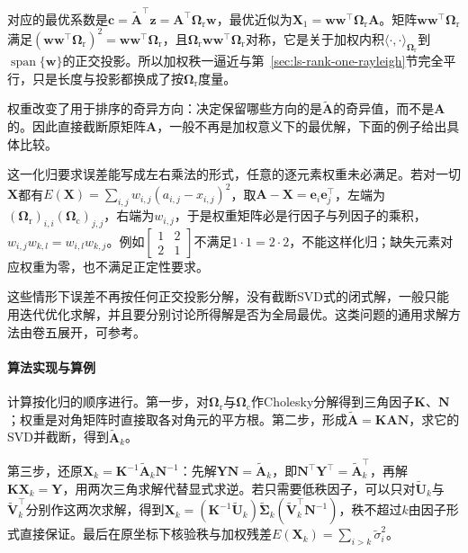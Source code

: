对应的最优系数是$\bm c=\widetilde{\bm A}^\top\bm z=\bm A^\top\bm\Omega_{\mathrm r}\bm w$，最优近似为$\bm X_1=\bm w\bm w^\top\bm\Omega_{\mathrm r}\bm A$。矩阵$\bm w\bm w^\top\bm\Omega_{\mathrm r}$满足$(\bm w\bm w^\top\bm\Omega_{\mathrm r})^2=\bm w\bm w^\top\bm\Omega_{\mathrm r}$，且$\bm\Omega_{\mathrm r}\bm w\bm w^\top\bm\Omega_{\mathrm r}$对称，它是关于加权内积$\langle\cdot,\cdot\rangle_{\bm\Omega_{\mathrm r}}$到$\operatorname{span}\{\bm w\}$的正交投影。所以加权秩一逼近与第~\ref{sec:ls-rank-one-rayleigh}节完全平行，只是长度与投影都换成了按$\bm\Omega_{\mathrm r}$度量。

权重改变了用于排序的奇异方向：决定保留哪些方向的是$\widetilde{\bm A}$的奇异值，而不是$\bm A$的。因此直接截断原矩阵$\bm A$，一般不再是加权意义下的最优解，下面的例子给出具体比较。

这一化归要求误差能写成左右乘法的形式，任意的逐元素权重未必满足。若对一切$\bm X$都有$E(\bm X)=\sum_{i,j}w_{i,j}(a_{i,j}-x_{i,j})^2$，取$\bm A-\bm X=\bm e_i\bm e_j^\top$，左端为$(\bm\Omega_{\mathrm r})_{i,i}(\bm\Omega_{\mathrm c})_{j,j}$，右端为$w_{i,j}$，于是权重矩阵必是行因子与列因子的乘积，$w_{i,j}w_{k,l}=w_{i,l}w_{k,j}$。例如$\left[\begin{smallmatrix}1&2\\2&1\end{smallmatrix}\right]$不满足$1\cdot1=2\cdot2$，不能这样化归；缺失元素对应权重为零，也不满足正定性要求。

这些情形下误差不再按任何正交投影分解，没有截断SVD式的闭式解，一般只能用迭代优化求解，并且要分别讨论所得解是否为全局最优。这类问题的通用求解方法由卷五展开，可参考。

\paragraph{算法实现与算例}

计算按化归的顺序进行。第一步，对$\bm\Omega_{\mathrm r}$与$\bm\Omega_{\mathrm c}$作Cholesky分解得到三角因子$\bm K$、$\bm N$；权重是对角矩阵时直接取各对角元的平方根。第二步，形成$\widetilde{\bm A}=\bm K\bm A\bm N$，求它的SVD并截断，得到$\widetilde{\bm A}_k$。

第三步，还原$\bm X_k=\bm K^{-1}\widetilde{\bm A}_k\bm N^{-1}$：先解$\bm Y\bm N=\widetilde{\bm A}_k$，即$\bm N^\top\bm Y^\top=\widetilde{\bm A}_k^\top$，再解$\bm K\bm X_k=\bm Y$，用两次三角求解代替显式求逆。若只需要低秩因子，可以只对$\widetilde{\bm U}_k$与$\widetilde{\bm V}_k^\top$分别作这两次求解，得到$\bm X_k=(\bm K^{-1}\widetilde{\bm U}_k)\widetilde{\bm\Sigma}_k(\widetilde{\bm V}_k^\top\bm N^{-1})$，秩不超过$k$由因子形式直接保证。最后在原坐标下核验秩与加权残差$E(\bm X_k)=\sum_{i>k}\tilde\sigma_i^2$。

